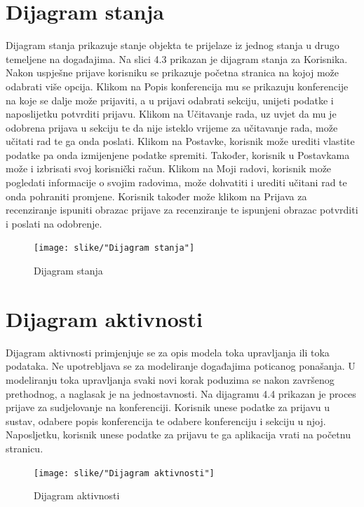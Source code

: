 		\section{Dijagram stanja}
			Dijagram stanja prikazuje stanje objekta te prijelaze iz jednog stanja u drugo temeljene na događajima. Na slici 4.3 prikazan je dijagram stanja za Korisnika. Nakon uspješne prijave korisniku se prikazuje početna stranica na kojoj može odabrati više opcija. Klikom na Popis konferencija mu se prikazuju konferencije na koje se dalje može prijaviti, a u prijavi odabrati sekciju, unijeti podatke i naposlijetku potvrditi prijavu. Klikom na Učitavanje rada, uz uvjet da mu je odobrena prijava u sekciju te da nije isteklo vrijeme za učitavanje rada, može učitati rad te ga onda poslati. Klikom na Postavke, korisnik može urediti vlastite podatke pa onda izmijenjene podatke spremiti. Također, korisnik u Postavkama može i izbrisati svoj korisnički račun. Klikom na Moji radovi, korisnik može pogledati informacije o svojim radovima, može dohvatiti i urediti učitani rad te onda pohraniti promjene. Korisnik također može klikom na Prijava za recenziranje ispuniti obrazac prijave za recenziranje te ispunjeni obrazac potvrditi i poslati na odobrenje.
			
			\begin{figure}[H]
				\texttt{[image: slike/"Dijagram stanja"]} %
				\centering
				\caption{Dijagram stanja}
				\label{State Diagram - Korisnik} %
			\end{figure}
			
			\eject
		
		\section{Dijagram aktivnosti}
			Dijagram aktivnosti primjenjuje se za opis modela toka upravljanja ili toka podataka. Ne upotrebljava se za modeliranje događajima poticanog ponašanja. U modeliranju toka upravljanja svaki novi korak poduzima se nakon završenog prethodnog, a naglasak je na jednostavnosti. Na dijagramu 4.4 prikazan je proces prijave za sudjelovanje na konferenciji. Korisnik unese podatke za prijavu u sustav, odabere popis konferencija te odabere konferenciju i sekciju u njoj. Naposljetku, korisnik unese podatke za prijavu te ga aplikacija vrati na početnu stranicu.
			
			\begin{figure}[H]
				\texttt{[image: slike/"Dijagram aktivnosti"]} %
				\centering
				\caption{Dijagram aktivnosti}
				\label{Activity Diagram - Prijava za sudjelovanje na konferenciji} %
			\end{figure}
			
